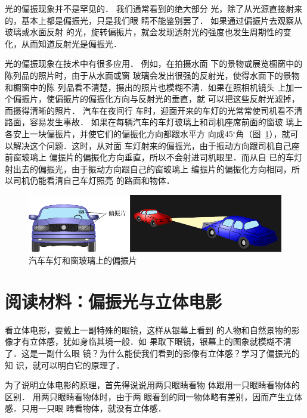 光的偏振现象并不是罕见的．
我们通常看到的绝大部分
光，除了从光源直接射来的，基本上都是偏振光，只是我们眼
睛不能鉴别罢了．
如果通过偏振片去观察从玻璃或水面反射
的光，旋转偏振片，就会发现透射光的强度也发生周期性的变
化，从而知道反射光是偏振光．

光的偏振现象在技术中有很多应用．
例如，在拍摄水面
下的景物或展览橱窗中的陈列品的照片时，由于从水面或窗
玻璃会发出很强的反射光，使得水面下的景物和橱窗中的陈
列品看不清楚，摄出的照片也模糊不清．如果在照相机镜头
上加一个偏振片，使偏振片的偏振化方向与反射光的垂直，就
可以把这些反射光滤掉，而摄得清晰的照片．
汽车在夜间行
车时，迎面开来的车灯的光常常使司机看不清路面，容易发生事故．
如果在每辆汽车的车灯玻璃上和司机座席前面的窗玻
璃上各安上一块偏振片，并使它们的偏振化方向都跟水平方
向成45$^\circ$角（图~\ref{fig_C_6-14}），就可以解决这个问题．这时，从对面
车灯射来的偏振光，由于振动方向跟司机自己座前窗玻璃上
偏振片的偏振化方向垂直，所以不会射进司机眼里．而从自
已的车灯射出去的偏振光，由于振动方向跟自己的窗玻璃上
编振片的偏振化方向相同，所以司机仍能看清自己车灯照亮
的路面和物体．

\begin{figure}[htbp]
    \centering
    \includegraphics{fig/C/6-14.pdf}
    \caption{汽车车灯和窗玻璃上的偏振片}\label{fig_C_6-14}
\end{figure}

\section*{阅读材料：偏振光与立体电影}
看立体电影，要戴上一副特殊的眼镜，这样从银幕上看到
的人物和自然景物的影像才有立体感，犹如身临其境一般．如
果取下眼镜，银幕上的图象就模糊不清了．这是一副什么眼
镜？为什么能使我们看到的影像有立体感？学习了偏振光的知
识，就可以明白它的原理了．

为了说明立体电影的原理，首先得说说用两只眼睛看物
体跟用一只眼睛看物体的区别．
用两只眼睛看物体时，由于两
眼看到的同一物体略有差别，因而产生立体感．只用一只眼
睛看物体，就没有立体感．

